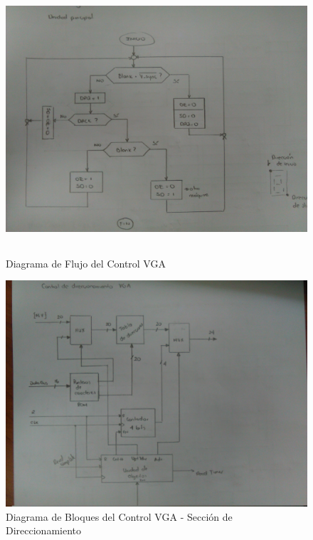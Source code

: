 \documentclass[12pt,a4paper]{report}
\begin{document}
\begin{figure}[hbtp]
	\centering
	\includegraphics[width=15cm,height=10cm]{Img/ControlVGAFlujo.jpg}
	\caption{Diagrama de Flujo del Control VGA}
	\label{fig:FlujoVGA1}
\end{figure}

\begin{figure}[hbtp]
	\centering
	\includegraphics[width=15cm]{Img/ControlDireccionamientoVGABloques.jpg}
	\caption{Diagrama de Bloques del Control VGA - Sección de Direccionamiento}
	\label{fig:DireccionamientoBloquesVGA1}
\end{figure}
\end{document}
